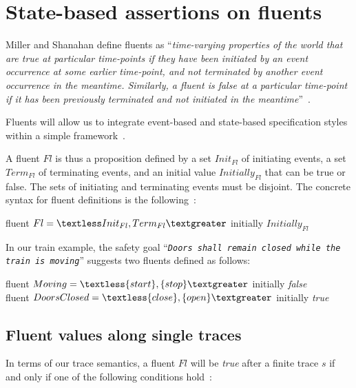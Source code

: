 \section{State-based assertions on fluents\label{section:background-fluents}}

Miller and Shanahan define fluents as ``\emph{time-varying properties of the world that are true at particular time-points if they have been initiated by an event occurrence at some earlier time-point, and not terminated by another event occurrence in the meantime. Similarly, a fluent is false at a particular time-point if it has been previously terminated and not initiated in the meantime}''~\cite{Miller:2002}.

Fluents will allow us to integrate event-based and state-based specification styles within a simple framework~\cite{Giannakopoulou:2003}. 

A fluent $Fl$ is thus a proposition defined by a set $Init_{Fl}$ of initiating events, a set $Term_{Fl}$ of terminating events, and an initial value $Initially_{Fl}$ that can be true or false. The sets of initiating and terminating events must be disjoint. The concrete syntax for fluent definitions is the following~\cite{Giannakopoulou:2003}:

\begin{center}
fluent $Fl = \textless Init_{Fl}, Term_{Fl} \textgreater $ initially $Initially_{Fl}$
\end{center}

In our train example, the safety goal ``\emph{\texttt{Doors shall remain closed while the train is moving}}'' suggests two fluents defined as follows:

\begin{center}
fluent $Moving = \textless \{start\}, \{stop\} \textgreater $ initially \emph{false} \\
fluent $DoorsClosed = \textless \{close\}, \{open\} \textgreater $ initially \emph{true} \\
\end{center}

\subsection{Fluent values along single traces\label{subsection:background-fluents-single-traces}}

In terms of our trace semantics, a fluent $Fl$ will be \emph{true} after a finite trace $s$ if and only if one of the following conditions hold~\cite{Giannakopoulou:2003}:

